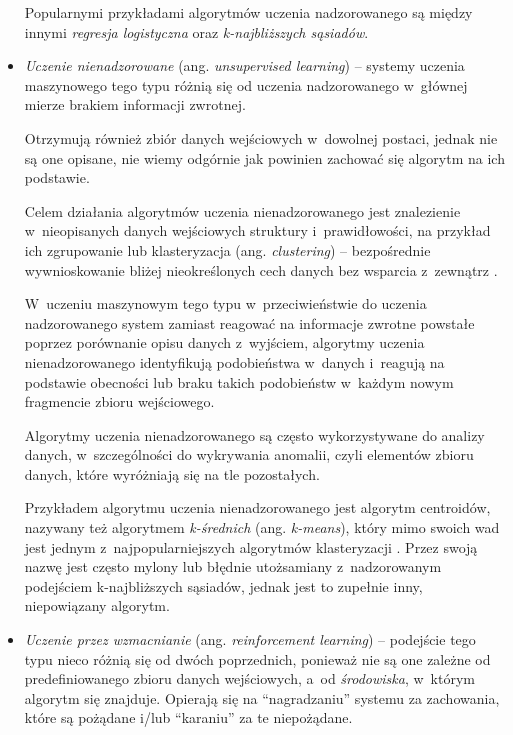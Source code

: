 \begin{itemize}
        Popularnymi przykładami algorytmów uczenia nadzorowanego są między innymi \emph{regresja logistyczna} oraz \emph{k-najbliższych sąsiadów}.


  \item \emph{Uczenie nienadzorowane} (ang. \emph{unsupervised learning}) --
        systemy uczenia maszynowego tego typu różnią się od uczenia nadzorowanego w~głównej mierze brakiem informacji zwrotnej.

        Otrzymują również zbiór danych wejściowych w~dowolnej postaci, jednak nie są one opisane, nie wiemy odgórnie jak powinien zachować się algorytm na ich podstawie.

        Celem działania algorytmów uczenia nienadzorowanego jest znalezienie w~nieopisanych danych wejściowych struktury i~prawidłowości, na przykład ich zgrupowanie lub klasteryzacja (ang. \emph{clustering}) -- bezpośrednie wywnioskowanie bliżej nieokreślonych cech danych bez wsparcia z~zewnątrz \cite{hastie2009unsupervised}.

        W~uczeniu maszynowym tego typu w~przeciwieństwie do uczenia nadzorowanego system zamiast reagować na informacje zwrotne powstałe poprzez porównanie opisu danych z~wyjściem, algorytmy uczenia nienadzorowanego identyfikują podobieństwa w~danych i~reagują na podstawie obecności lub braku takich podobieństw w~każdym nowym fragmencie zbioru wejściowego.

        Algorytmy uczenia nienadzorowanego są często wykorzystywane do analizy danych, w~szczególności do wykrywania anomalii, czyli elementów zbioru danych, które wyróżniają się na tle pozostałych.

        Przykładem algorytmu uczenia nienadzorowanego jest algorytm centroidów, nazywany też algorytmem \emph{k-średnich} (ang. \emph{k-means}), który mimo swoich wad jest jednym z~najpopularniejszych algorytmów klasteryzacji \cite{ahmed2020k}.
        Przez swoją nazwę jest często mylony lub błędnie utożsamiany z~nadzorowanym podejściem k-najbliższych sąsiadów, jednak jest to zupełnie inny, niepowiązany algorytm.

  \item \emph{Uczenie przez wzmacnianie} (ang. \emph{reinforcement learning}) --
        podejście tego typu nieco różnią się od dwóch poprzednich, ponieważ nie są one zależne od predefiniowanego zbioru danych wejściowych, a~od \emph{środowiska}, w~którym algorytm się znajduje.
        Opierają się na ``nagradzaniu'' systemu za zachowania, które są pożądane i/lub ``karaniu'' za te niepożądane.


\end{itemize}
